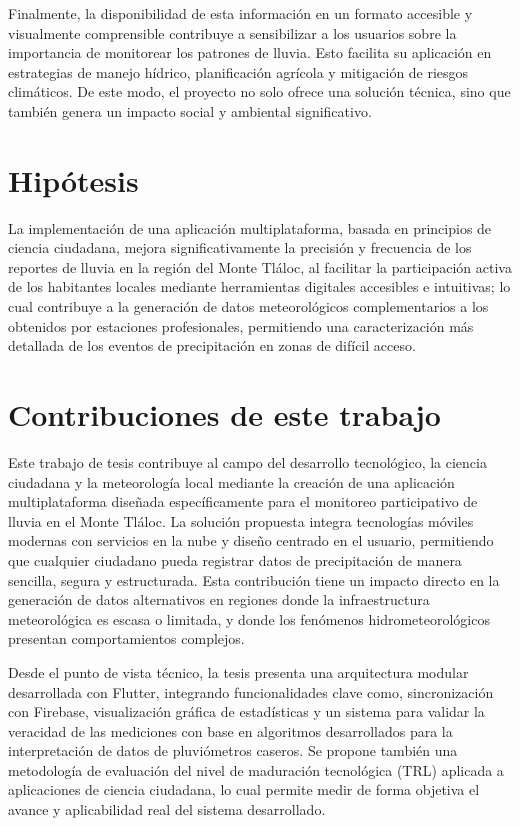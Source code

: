 Finalmente, la disponibilidad de esta información en un formato accesible y visualmente comprensible contribuye a sensibilizar a los usuarios sobre la importancia de monitorear los patrones de lluvia. Esto facilita su aplicación en estrategias de manejo hídrico, planificación agrícola y mitigación de riesgos climáticos. De este modo, el proyecto no solo ofrece una solución técnica, sino que también genera un impacto social y ambiental significativo.

\section{Hipótesis}

La implementación de una aplicación multiplataforma, basada en principios de ciencia ciudadana, mejora significativamente la precisión y frecuencia de los reportes de lluvia en la región del Monte Tláloc, al facilitar la participación activa de los habitantes locales mediante herramientas digitales accesibles e intuitivas; lo cual contribuye a la generación de datos meteorológicos complementarios a los obtenidos por estaciones profesionales, permitiendo una caracterización más detallada de los eventos de precipitación en zonas de difícil acceso.



\section{Contribuciones de este trabajo}

Este trabajo de tesis contribuye al campo del desarrollo tecnológico, la ciencia ciudadana y la meteorología local mediante la creación de una aplicación multiplataforma diseñada específicamente para el monitoreo participativo de lluvia en el Monte Tláloc. La solución propuesta integra tecnologías móviles modernas con servicios en la nube y diseño centrado en el usuario, permitiendo que cualquier ciudadano pueda registrar datos de precipitación de manera sencilla, segura y estructurada. Esta contribución tiene un impacto directo en la generación de datos alternativos en regiones donde la infraestructura meteorológica es escasa o limitada, y donde los fenómenos hidrometeorológicos presentan comportamientos complejos.

Desde el punto de vista técnico, la tesis presenta una arquitectura modular desarrollada con Flutter, integrando funcionalidades clave como, sincronización con Firebase, visualización gráfica de estadísticas y un sistema para validar la veracidad de las mediciones con base en algoritmos desarrollados para la interpretación de datos de pluviómetros caseros. Se propone también una metodología de evaluación del nivel de maduración tecnológica (TRL) aplicada a aplicaciones de ciencia ciudadana, lo cual permite medir de forma objetiva el avance y aplicabilidad real del sistema desarrollado.

